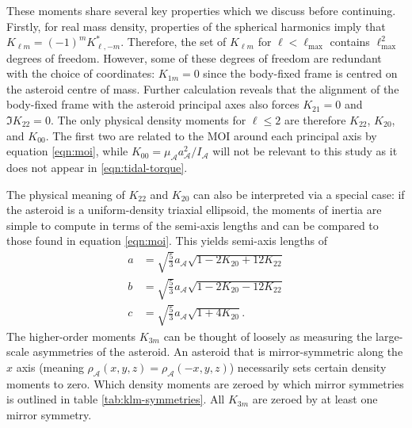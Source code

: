 These moments share several key properties which we discuss before continuing. Firstly, for real mass density, properties of the spherical harmonics imply that $K_{\ell m} = (-1)^m K_{\ell, -m}^*$. Therefore, the set of $K_{\ell m}$ for $\ell < \ell_\text{max}$ contains $\ell_\text{max}^2$ degrees of freedom. However, some of these degrees of freedom are redundant with the choice of coordinates: $K_{1m} = 0$ since the body-fixed frame is centred on the asteroid centre of mass. Further calculation reveals that the alignment of the body-fixed frame with the asteroid principal axes also forces $K_{21}= 0$ and $\Im K_{22}=0$. The only physical density moments for $\ell \leq 2$ are therefore $K_{22}$, $K_{20}$, and $K_{00}$. The first two are related to the MOI around each principal axis by equation \ref{eqn:moi}, while $K_{00} = \mu_\mathcal{A} a_\mathcal{A}^2 / I_\mathcal{A}$ will not be relevant to this study as it does not appear in \ref{eqn:tidal-torque}. 

The physical meaning of $K_{22}$ and $K_{20}$ can also be interpreted via a special case: if the asteroid is a uniform-density triaxial ellipsoid, the moments of inertia are simple to compute in terms of the semi-axis lengths and can be compared to those found in equation \ref{eqn:moi}. This yields semi-axis lengths of 
\begin{equation}
  \begin{split}
  a &= \sqrt{\frac{5}{3}}a_\mathcal{A}\sqrt{1-2K_{20}+12K_{22}}\\
  b &= \sqrt{\frac{5}{3}}a_\mathcal{A}\sqrt{1-2K_{20}-12K_{22}}\\
  c &= \sqrt{\frac{5}{3}}a_\mathcal{A}\sqrt{1+4K_{20}}.
  \label{eqn:ellipsoid-axes}
  \end{split}
\end{equation}
The higher-order moments $K_{3m}$ can be thought of loosely as measuring the large-scale asymmetries of the asteroid. An asteroid that is mirror-symmetric along the $\unit{x}$ axis (meaning $\rho_\mathcal{A}(x,y,z)=\rho_\mathcal{A}(-x,y,z)$) necessarily sets certain density moments to zero. Which density moments are zeroed by which mirror symmetries is outlined in table \ref{tab:klm-symmetries}. All $K_{3m}$ are zeroed by at least one mirror symmetry. 

